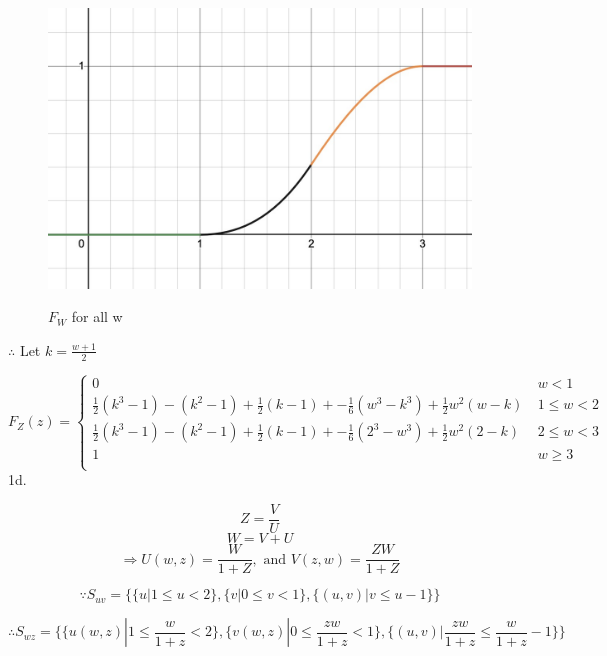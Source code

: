 \documentclass{article} %
\newcommand{\question}[2][]{\begin{flushleft}
        \textbf{Question #1}: \textit{#2}

\end{flushleft}}
\begin{document}
    \begin{figure}[]
        \centering
        \includegraphics[scale=0.20]{HW/HW4/p1c_fw.jpg}
        \label{fig:$F_W,all$}
        \caption{$F_W$ for all w}    
    \end{figure}

    $\therefore$ Let $k=\frac{w+1}{2}$
    
    $F_Z(z) = \left\{ \begin{array}{cl}
        0  &  \ w < 1 \\
        \frac{1}{2}(k^3-1)-(k^2-1)+\frac{1}{2}(k-1)+-\frac{1}{6}(w^3-k^3)+\frac{1}{2}w^2(w-k) &  \ 1 \leq w < 2 \\
        \frac{1}{2}(k^3-1)-(k^2-1)+\frac{1}{2}(k-1)+-\frac{1}{6}(2^3-w^3)+\frac{1}{2}w^2(2-k)  &  \ 2 \leq w < 3 \\
        1 &  \ w \geq 3 \\
        \end{array} \right.$
\newpage
    1d.

    $$Z = \frac{V}{U}$$
    $$W = V+U$$
    $$\Rightarrow U(w,z)=\frac{W}{1+Z}, \text{ and } V(z,w)=\frac{ZW}{1+Z}$$

    $$\because S_{uv}=\{{\{u| 1 \leq u < 2\},\{v| 0 \leq v < 1\},\{(u,v)| v \leq u-1 \}}\}$$

    $$\therefore S_{wz}=\{{\{u(w,z)| 1 \leq \frac{w}{1+z} < 2\},\{v(w,z)| 0 \leq \frac{zw}{1+z} < 1\},\{(u,v)| \frac{zw}{1+z} \leq \frac{w}{1+z}-1 \}}\}$$
    
    
    
\end{document}
